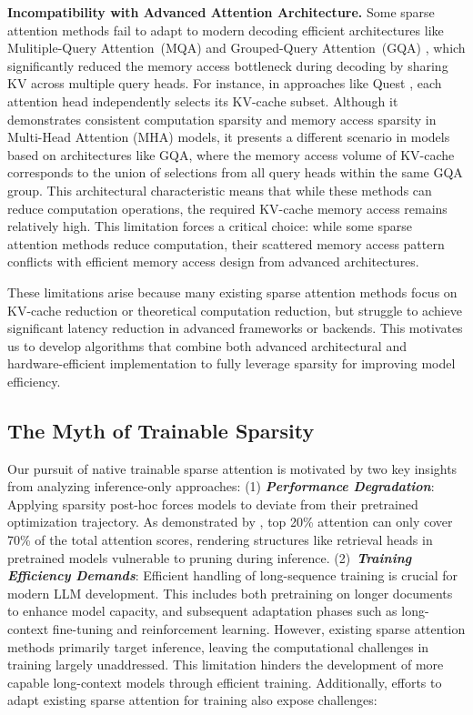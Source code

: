 \textbf{Incompatibility with Advanced Attention Architecture.}
Some sparse attention methods fail to adapt to modern decoding efficient architectures like Mulitiple-Query Attention~(MQA) \citep{mqa} and Grouped-Query Attention~(GQA) \citep{gqa}, which significantly reduced the memory access bottleneck during decoding by sharing KV across multiple query heads. For instance, in approaches like Quest \citep{quest}, each attention head independently selects its KV-cache subset. Although it demonstrates consistent computation sparsity and memory access sparsity in Multi-Head Attention (MHA) models, it presents a different scenario in models based on architectures like GQA, where the memory access volume of KV-cache corresponds to the union of selections from all query heads within the same GQA group. This architectural characteristic means that while these methods can reduce computation operations, the required KV-cache memory access remains relatively high.
This limitation forces a critical choice: while some sparse attention methods reduce computation, their scattered memory access pattern conflicts with efficient memory access design from advanced architectures.

These limitations arise because many existing sparse attention methods focus on KV-cache reduction or theoretical computation reduction, but struggle to achieve significant latency reduction in advanced frameworks or backends.
This motivates us to develop algorithms that combine both advanced architectural and hardware-efficient implementation to fully leverage sparsity for improving model efficiency.


\subsection{The Myth of Trainable Sparsity}
Our pursuit of native trainable sparse attention is motivated by two key insights from analyzing inference-only approaches:
(1) \textbf{\textit{Performance Degradation}}: Applying sparsity post-hoc forces models to deviate from their pretrained optimization trajectory. As demonstrated by \citet{magicpig}, top 20\% attention can only cover 70\% of the total attention scores, rendering structures like retrieval heads in pretrained models vulnerable to pruning during inference.
(2)~\textbf{\textit{Training Efficiency Demands}}: 
Efficient handling of  long-sequence training is crucial for modern LLM development. This includes both pretraining on longer documents to enhance model capacity, and subsequent adaptation phases such as long-context fine-tuning and reinforcement learning. However, existing sparse attention methods primarily target inference, leaving the computational challenges in training largely unaddressed. This limitation hinders the development of more capable long-context models through efficient training. Additionally, efforts to adapt existing sparse attention for training also expose challenges:




